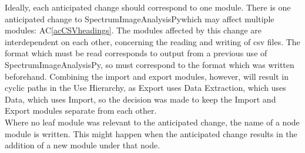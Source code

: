 \documentclass[12pt, titlepage]{article}
\newcommand{\acref}[1]{AC\ref{#1}}
\newcommand{\progname}{SpectrumImageAnalysisPy}
\begin{document}
Ideally, each anticipated change should correspond to one module. There is one
anticipated change to \progname which may affect multiple modules:
\acref{acCSVheadings}. The modules affected by this change are interdependent on
each other, concerning the reading and writing of csv files. The format which
must be read corresponds to output from a previous use of \progname, so must
correspond to the format which was written beforehand. Combining the import and
export modules, however, will result in cyclic paths in the Use Hierarchy, as
Export uses Data Extraction, which uses Data, which uses Import, so the decision
was made to keep the Import and Export modules separate from each other.\\

Where no leaf module was relevant to the anticipated change, the name of a node
module is written. This might happen when the anticipated change results in the
addition of a new module under that node.
\end{document}
